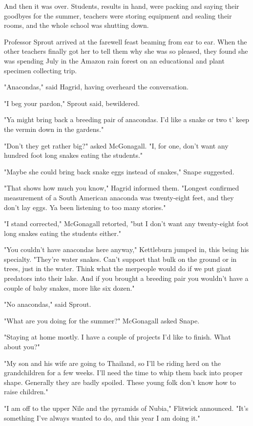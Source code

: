 And then it was over. Students, results in hand, were packing and saying their goodbyes for the summer, teachers were storing equipment and sealing their rooms, and the whole school was shutting down.

Professor Sprout arrived at the farewell feast beaming from ear to ear. When the other teachers finally got her to tell them why she was so pleased, they found she was spending July in the Amazon rain forest on an educational and plant specimen collecting trip.

"Anacondas," said Hagrid, having overheard the conversation.

"I beg your pardon," Sprout said, bewildered.

"Ya might bring back a breeding pair of anacondas. I'd like a snake or two t' keep the vermin down in the gardens."

"Don't they get rather big?" asked McGonagall. "I, for one, don't want any hundred foot long snakes eating the students."

"Maybe she could bring back snake eggs instead of snakes," Snape suggested.

"That shows how much you know," Hagrid informed them. "Longest confirmed measurement of a South American anaconda was twenty-eight feet, and they don't lay eggs. Ya been listening to too many stories."

"I stand corrected," McGonagall retorted, "but I don't want any twenty-eight foot long snakes eating the students either."

"You couldn't have anacondas here anyway," Kettleburn jumped in, this being his specialty. "They're water snakes. Can't support that bulk on the ground or in trees, just in the water. Think what the merpeople would do if we put giant predators into their lake. And if you brought a breeding pair you wouldn't have a couple of baby snakes, more like six dozen."

"No anacondas," said Sprout.

"What are you doing for the summer?" McGonagall asked Snape.

"Staying at home mostly. I have a couple of projects I'd like to finish. What about you?"

"My son and his wife are going to Thailand, so I'll be riding herd on the grandchildren for a few weeks. I'll need the time to whip them back into proper shape. Generally they are badly spoiled. These young folk don't know how to raise children."

"I am off to the upper Nile and the pyramids of Nubia," Flitwick announced. "It's something I've always wanted to do, and this year I am doing it."

